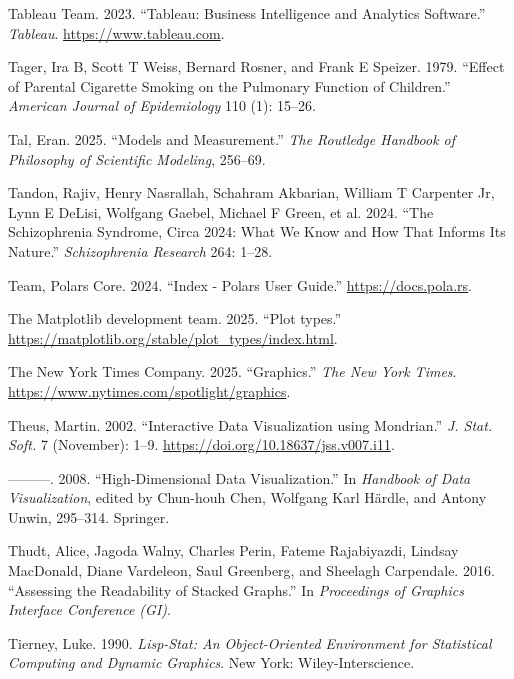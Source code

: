 \documentclass[
  openany]{book}
\newlength{\cslhangindent}
\newenvironment{CSLReferences}[2] %
 {\begin{list}{}{%
  \setlength{\itemindent}{0pt}
  \setlength{\leftmargin}{0pt}
  \setlength{\parsep}{0pt}
  \ifodd #1
   \setlength{\leftmargin}{\cslhangindent}
   \setlength{\itemindent}{-1\cslhangindent}
  \fi
  \setlength{\itemsep}{#2\baselineskip}}}
 {\end{list}}
\theoremstyle{definition}
\theoremstyle{definition}
\theoremstyle{definition}
\theoremstyle{definition}
\theoremstyle{remark}
\begin{document}
\begin{CSLReferences}{1}{0}
Tableau Team. 2023. {``{Tableau: Business Intelligence and Analytics Software}.''} \emph{Tableau}. \url{https://www.tableau.com}.

Tager, Ira B, Scott T Weiss, Bernard Rosner, and Frank E Speizer. 1979. {``Effect of Parental Cigarette Smoking on the Pulmonary Function of Children.''} \emph{American Journal of Epidemiology} 110 (1): 15--26.

Tal, Eran. 2025. {``Models and Measurement.''} \emph{The Routledge Handbook of Philosophy of Scientific Modeling}, 256--69.

Tandon, Rajiv, Henry Nasrallah, Schahram Akbarian, William T Carpenter Jr, Lynn E DeLisi, Wolfgang Gaebel, Michael F Green, et al. 2024. {``The Schizophrenia Syndrome, Circa 2024: What We Know and How That Informs Its Nature.''} \emph{Schizophrenia Research} 264: 1--28.

Team, Polars Core. 2024. {``Index - Polars User Guide.''} \url{https://docs.pola.rs}.

The Matplotlib development team. 2025. {``{Plot types}.''} \url{https://matplotlib.org/stable/plot_types/index.html}.

The New York Times Company. 2025. {``Graphics.''} \emph{The New York Times}. \url{https://www.nytimes.com/spotlight/graphics}.

Theus, Martin. 2002. {``{Interactive Data Visualization using Mondrian}.''} \emph{J. Stat. Soft.} 7 (November): 1--9. \url{https://doi.org/10.18637/jss.v007.i11}.

---------. 2008. {``High-Dimensional Data Visualization.''} In \emph{Handbook of Data Visualization}, edited by Chun-houh Chen, Wolfgang Karl Härdle, and Antony Unwin, 295--314. Springer.

Thudt, Alice, Jagoda Walny, Charles Perin, Fateme Rajabiyazdi, Lindsay MacDonald, Diane Vardeleon, Saul Greenberg, and Sheelagh Carpendale. 2016. {``Assessing the Readability of Stacked Graphs.''} In \emph{Proceedings of Graphics Interface Conference (GI)}.

Tierney, Luke. 1990. \emph{Lisp-Stat: An Object-Oriented Environment for Statistical Computing and Dynamic Graphics}. New York: Wiley-Interscience.


\end{CSLReferences}
\end{document}
